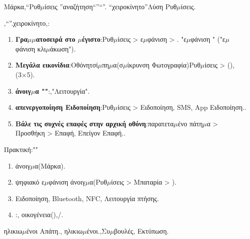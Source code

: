 Μάρκα,“Ρυθ$\mu$ίσεις ”αναζήτηση“”“”. “χειροκίνητο”Λύση Ρυθ$\mu$ίσεις.


,“”.χειροκίνητο,:

\begin{enumerate}
  \item \textbf{Γρα$\mu$$\mu$ατοσειρά στο $\mu$έγιστο}:Ρυθ$\mu$ίσεις > ε$\mu$φάνιση > . "ε$\mu$φάνιση " ("ε$\mu$φάνιση κλι$\mu$άκωση").
  \item \textbf{Μεγάλα εικονίδια}:Οθόνητσί$\mu$πη$\mu$α(σ$\mu$ίκρυνση Φωτογραφία)Ρυθ$\mu$ίσεις > (),(3×5).
  \item \textbf{άνοιγ$\mu$α ""}:,"Λειτουργία".
  \item \textbf{απενεργοποίηση Ειδοποίηση}:Ρυθ$\mu$ίσεις > Ειδοποίηση, SMS, App Ειδοποίηση..
  \item \textbf{Βάλε τις συχνές επαφές στην αρχική οθόνη}:παρατετα$\mu$ένο πάτη$\mu$α > Προσθήκη > Επαφή, Επείγον Επαφή..
\end{enumerate}

\begin{tcbpractice}{Πρακτική:""}
\begin{enumerate}
  \item άνοιγ$\mu$α(Μάρκα).
  \item ψηφιακό ε$\mu$φάνιση άνοιγ$\mu$α(Ρυθ$\mu$ίσεις > Μπαταρία > ).
  \item Ειδοποίηση, Bluetooth, NFC, Λειτουργία πτήσης.
  \item :, οικογένεια(),/.
\end{enumerate}

\end{tcbpractice}


ηλικιω$\mu$ένοι Απάτη., ηλικιω$\mu$ένοι.,Συ$\mu$βουλές, Εκτύπωση.


